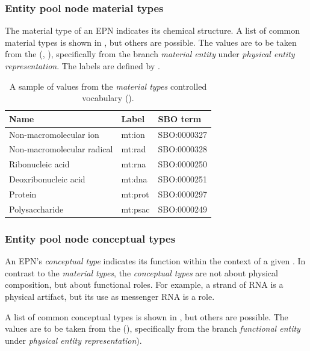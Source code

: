 \subsubsection{Entity pool node material types}
\label{sec:material-types-cv}

The material type of an EPN indicates its chemical structure.  A list of common material types is shown in , but others are possible.  The values are to be taken from the \sbo (\cite{Courtot:2011}, \sbourl), specifically from the branch \emph{material entity} under \emph{physical entity representation}.  The labels are defined by \SBGNPDLone.

\begin{table}[h]
  \centering
  \begin{tabular}{l>{\ttfamily}l>{\ttfamily}l}
    \toprule
    \textbf{Name}              & \textbf{\rmfamily Label} & \textbf{\rmfamily SBO term} \\
    \midrule
    Non-macromolecular ion     & mt:ion  & SBO:0000327\\
    Non-macromolecular radical & mt:rad  & SBO:0000328\\
    Ribonucleic acid           & mt:rna  & SBO:0000250\\
    Deoxribonucleic acid       & mt:dna  & SBO:0000251\\
    Protein                    & mt:prot & SBO:0000297\\
    Polysaccharide             & mt:psac & SBO:0000249\\
    \bottomrule
  \end{tabular}
  \caption{A sample of values from the \emph{material types} controlled
    vocabulary ().}
  \label{tab:material-types-cv}
\end{table}


\subsubsection{Entity pool node conceptual types}
\label{sec:conceptual-types-cv}

An EPN's \emph{conceptual type} indicates its function within the context of a given \PD.  
In contrast to the \emph{material types}, the \emph{conceptual types} are not about physical composition, but about functional roles.  For example, a strand of RNA is a physical artifact, but its use as messenger RNA is a role.

A list of common conceptual types is shown in , but others are possible.  The values are to be taken from the \sbo (\sbourl), specifically from the branch \emph{functional entity} under \emph{physical entity representation}). 

